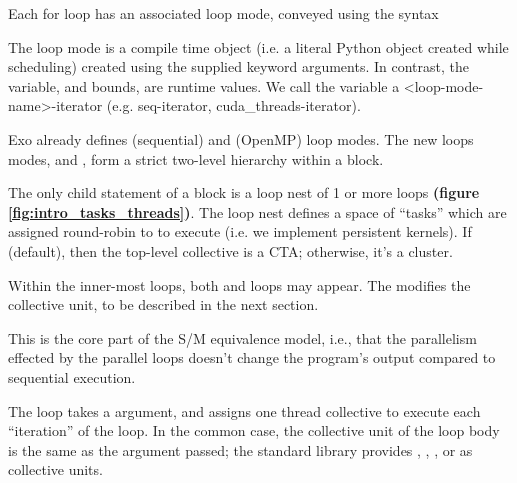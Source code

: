 \filbreak
{}

\begin{figure*}[!b]

\caption{Simple vector addition example. We break  and  into chunks of 128 values, each handled by one ``task''.}
\label{fig:intro_tasks_threads}
\end{figure*}

Each for loop has an associated loop mode, conveyed using the syntax



The loop mode is a compile time object (i.e. a literal Python object created while scheduling) created using the supplied keyword arguments.
In contrast, the  variable, and  bounds, are runtime values.
We call the  variable a <loop-mode-name>-iterator (e.g. seq-iterator, cuda\_threads-iterator).

\filbreak
Exo already defines  (sequential) and  (OpenMP) loop modes.
The new loops modes,  and , form a strict two-level hierarchy within a  block.

\filbreak
The only child statement of a  block is a loop nest of 1 or more  loops \textbf{(figure \ref{fig:intro_tasks_threads})}.
The loop nest defines a space of ``tasks'' which are assigned round-robin to  to execute (i.e. we implement persistent kernels).
If  (default), then the top-level collective is a CTA; otherwise, it's a cluster.

\filbreak
Within the inner-most  loops, both  and  loops may appear.
The  modifies the collective unit, to be described in the next section.

 This is the core part of the S/M equivalence model, i.e., that the parallelism effected by the parallel loops doesn't change the program's output compared to sequential execution.

\filbreak
{}



The  loop takes a  argument, and assigns one thread collective to execute each ``iteration'' of the loop.
In the common case, the collective unit of the loop body is the same as the  argument passed; the standard library provides , , , or  as collective units.

